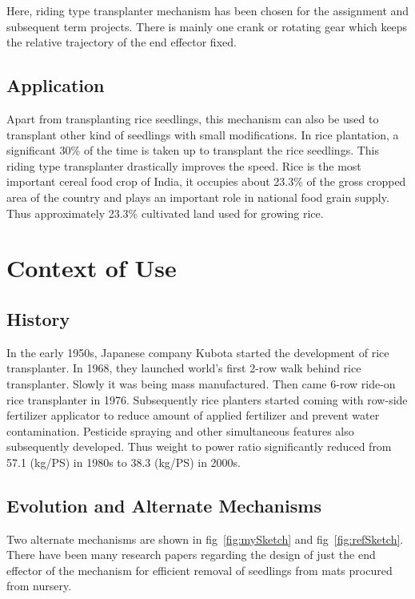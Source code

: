 \documentclass[a4paper,latin,center,onecolumn]{paper}
\begin{document}
            Here, riding type transplanter mechanism has been chosen for the assignment and subsequent term projects. There is mainly one crank or rotating gear which keeps the relative trajectory of the end effector fixed.

        \subsection{Application}
            Apart from transplanting rice seedlings, this mechanism can also be used to transplant other kind of seedlings with small modifications. In rice plantation, a significant 30\% of the time is taken up to transplant the rice seedlings. This riding type transplanter drastically improves the speed. Rice is the most important cereal food crop of India, it occupies about 23.3\% of the gross cropped area of the country and plays an important role in national food grain supply. Thus approximately 23.3\% cultivated land used for growing rice.
        
    \section{Context of Use} 
        \subsection{History}
            In the early 1950s, Japanese company Kubota started the development of rice transplanter. In 1968, they launched world's first 2-row walk behind rice transplanter. Slowly it was being mass manufactured. Then came 6-row ride-on rice transplanter in 1976. Subsequently rice planters started coming with row-side fertilizer applicator to reduce amount of applied fertilizer and prevent water contamination. Pesticide spraying and other simultaneous features also subsequently developed. Thus weight to power ratio significantly reduced from 57.1 (kg/PS) in 1980s to 38.3 (kg/PS) in 2000s.
        
        \subsection{Evolution and Alternate Mechanisms}
            Two alternate mechanisms are shown in fig~\ref{fig:mySketch} and fig~\ref{fig:refSketch}. There have been many research papers regarding the design of just the end effector of the mechanism for efficient removal of seedlings from mats procured from nursery. \par
\end{document}
